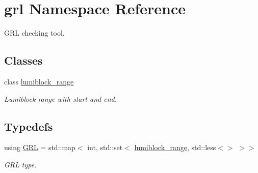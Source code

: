 \hypertarget{namespacegrl}{}\section{grl Namespace Reference}
\label{namespacegrl}


G\+RL checking tool.  


\subsection*{Classes}
\begin{DoxyCompactItemize}
\item 
class \mbox{\hyperlink{classgrl_1_1lumiblock__range}{lumiblock\+\_\+range}}
\begin{DoxyCompactList}\small\item\em Lumiblock range with start and end. \end{DoxyCompactList}\end{DoxyCompactItemize}
\subsection*{Typedefs}
\begin{DoxyCompactItemize}
\item 
\mbox{\label{namespacegrl_a16e314a8a6edc3eeb64c6e8770ffafec}} 
using \mbox{\hyperlink{namespacegrl_a16e314a8a6edc3eeb64c6e8770ffafec}{G\+RL}} = std\+::map$<$ int, std\+::set$<$ \mbox{\hyperlink{classgrl_1_1lumiblock__range}{lumiblock\+\_\+range}}, std\+::less$<$$>$ $>$$>$
\begin{DoxyCompactList}\small\item\em G\+RL type. \end{DoxyCompactList}\end{DoxyCompactItemize}
